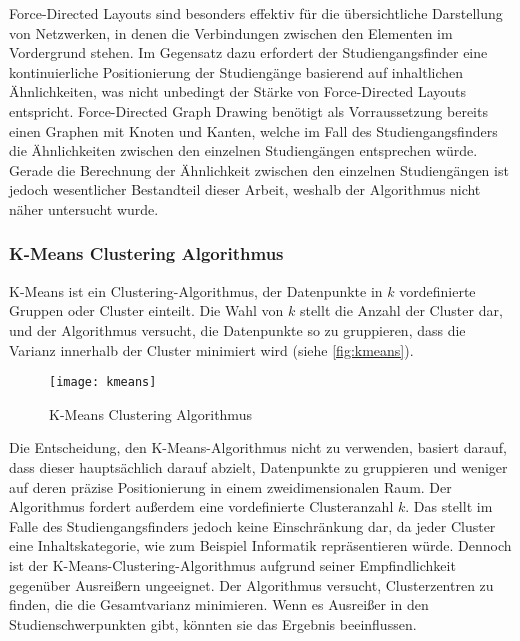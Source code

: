Force-Directed Layouts sind besonders effektiv für die übersichtliche
Darstellung von Netzwerken, in denen die Verbindungen zwischen den Elementen im
Vordergrund stehen. \parencite{schonfeld_fruchtermanreingold_2019} Im Gegensatz dazu
erfordert der Studiengangsfinder eine kontinuierliche Positionierung der
Studiengänge basierend auf inhaltlichen Ähnlichkeiten, was nicht unbedingt der
Stärke von Force-Directed Layouts entspricht. Force-Directed Graph Drawing
benötigt als Vorraussetzung bereits einen Graphen mit Knoten und Kanten, welche
im Fall des Studiengangsfinders die Ähnlichkeiten zwischen den einzelnen
Studiengängen entsprechen würde. Gerade die Berechnung der Ähnlichkeit zwischen
den einzelnen Studiengängen ist jedoch wesentlicher Bestandteil dieser Arbeit,
weshalb der Algorithmus nicht näher untersucht wurde.

\subsubsection{K-Means Clustering Algorithmus}
K-Means ist ein Clustering-Algorithmus, der Datenpunkte in $k$ vordefinierte
Gruppen oder Cluster einteilt. Die Wahl von $k$ stellt die Anzahl der Cluster dar,
und der Algorithmus versucht, die Datenpunkte so zu gruppieren, dass die Varianz
innerhalb der Cluster minimiert wird (siehe \autoref{fig:kmeans}).
\parencite{jeffares_k-means_2019}

\begin{figure}[H]
    \centering
    \texttt{[image: kmeans]}
    \caption{K-Means Clustering Algorithmus}
    \label{fig:kmeans}
\end{figure}

Die Entscheidung, den K-Means-Algorithmus nicht zu verwenden, basiert darauf, dass dieser hauptsächlich darauf abzielt, Datenpunkte zu gruppieren und weniger auf deren präzise Positionierung in einem zweidimensionalen Raum. Der Algorithmus fordert außerdem eine vordefinierte Clusteranzahl $k$. Das stellt im Falle des Studiengangsfinders jedoch keine Einschränkung dar, da jeder Cluster eine Inhaltskategorie, wie zum Beispiel \glqq Informatik\grqq{} repräsentieren würde. Dennoch ist der K-Means-Clustering-Algorithmus aufgrund seiner Empfindlichkeit gegenüber Ausreißern ungeeignet. Der Algorithmus versucht, Clusterzentren zu finden, die die Gesamtvarianz minimieren. Wenn es Ausreißer in den Studienschwerpunkten gibt, könnten sie das Ergebnis beeinflussen. \parencite{roth_demonstration_2023}

